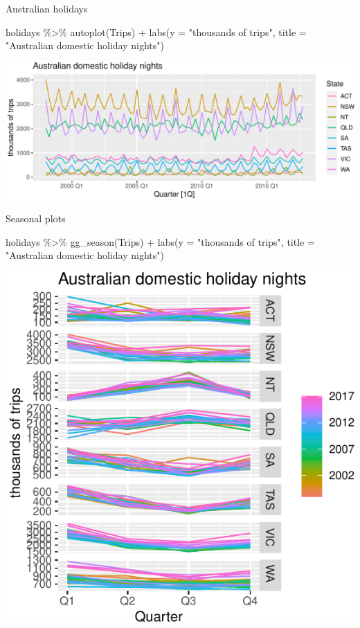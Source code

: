 \documentclass[14pt,ignorenonframetext,aspectratio=169]{beamer}
\newenvironment{Shaded}{\begin{snugshade}}{\end{snugshade}}
\newcommand{\AttributeTok}[1]{\textcolor[rgb]{0.77,0.63,0.00}{#1}}
\newcommand{\FunctionTok}[1]{\textcolor[rgb]{0.00,0.00,0.00}{#1}}
\newcommand{\NormalTok}[1]{#1}
\newcommand{\SpecialCharTok}[1]{\textcolor[rgb]{0.00,0.00,0.00}{#1}}
\newcommand{\StringTok}[1]{\textcolor[rgb]{0.31,0.60,0.02}{#1}}
\renewenvironment{Shaded}{\color{black}\begin{snugshade}\color{black}}{\end{snugshade}}
\renewenvironment{Shaded}{\color{black}\fontsize{10}{10}\sf\begin{snugshade}\color{black}}{\end{snugshade}}
\begin{document}
\begin{frame}[fragile]{Australian holidays}
\protect\hypertarget{australian-holidays-1}{}
\fontsize{9}{10}\sf

\begin{Shaded}
\begin{Highlighting}[]
\NormalTok{holidays }\SpecialCharTok{\%\textgreater{}\%} \FunctionTok{autoplot}\NormalTok{(Trips) }\SpecialCharTok{+}
  \FunctionTok{labs}\NormalTok{(}\AttributeTok{y =} \StringTok{"thousands of trips"}\NormalTok{, }\AttributeTok{title =} \StringTok{"Australian domestic holiday nights"}\NormalTok{)}
\end{Highlighting}
\end{Shaded}

\includegraphics{2-tsgraphics_files/figure-beamer/holidays-plot-1.pdf}
\end{frame}

\begin{frame}[fragile]{Seasonal plots}
\protect\hypertarget{seasonal-plots-2}{}
\fontsize{9}{10}\sf

\begin{Shaded}
\begin{Highlighting}[]
\NormalTok{holidays }\SpecialCharTok{\%\textgreater{}\%} \FunctionTok{gg\_season}\NormalTok{(Trips) }\SpecialCharTok{+}
  \FunctionTok{labs}\NormalTok{(}\AttributeTok{y =} \StringTok{"thousands of trips"}\NormalTok{, }\AttributeTok{title =} \StringTok{"Australian domestic holiday nights"}\NormalTok{)}
\end{Highlighting}
\end{Shaded}

\includegraphics[width=0.45\linewidth]{2-tsgraphics_files/figure-beamer/graphics1-1}
\end{frame}
\end{document}
